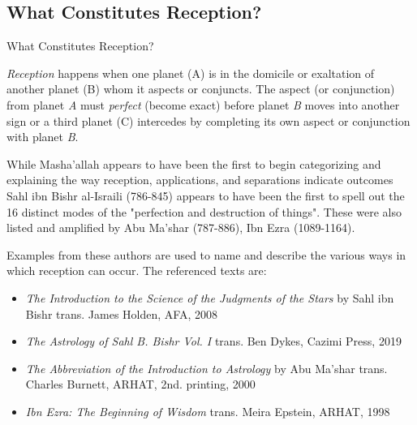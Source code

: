 \subsection{What Constitutes Reception?}
\begin{frame}[t]{What Constitutes Reception?}
\small
\begin{block}{}
\textsl{Reception} happens when one planet (A) is in the domicile or exaltation of another planet (B) whom it aspects or conjuncts. The aspect (or conjunction) from planet \textsl{A} must \textsl{perfect} (become exact)  before planet \textsl{B} moves into another sign or a third planet (C) intercedes by completing its own aspect or conjunction with planet \textsl{B}.
\end{block}

While Masha'allah appears to have been the first to begin categorizing and explaining the way reception, applications, and separations indicate outcomes Sahl ibn Bishr al-Israili (786-845) appears to have been the first to spell out the 16 distinct modes of the "perfection and destruction of things". These were also listed and amplified by  Abu Ma'shar (787-886),  Ibn Ezra (1089-1164).

Examples from these authors are used to name and describe the various ways in which reception can occur. The referenced texts are:
\begin{itemize}
\small
\item \textsl{The Introduction to the Science of the Judgments of the Stars} by Sahl ibn Bishr trans. James Holden, AFA, 2008 
\item \textsl{The Astrology of Sahl B. Bishr Vol. I} trans. Ben Dykes, Cazimi Press, 2019

\item \textsl{The Abbreviation of the Introduction to Astrology} by Abu Ma'shar trans. Charles Burnett, ARHAT, 2nd. printing, 2000

\item \textsl{Ibn Ezra: The Beginning of Wisdom} trans. Meira Epstein, ARHAT, 1998
\end{itemize}

\end{frame}
